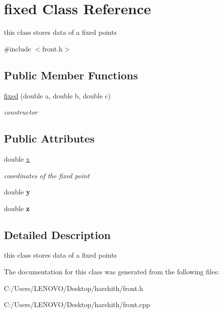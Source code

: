 \hypertarget{classfixed}{}\section{fixed Class Reference}
\label{classfixed}


this class stores data of a fixed points  




{\ttfamily \#include $<$front.\+h$>$}

\subsection*{Public Member Functions}
\begin{DoxyCompactItemize}
\item 
\mbox{\label{classfixed_a357837c437a38a78aabae80136f26679}} 
\mbox{\hyperlink{classfixed_a357837c437a38a78aabae80136f26679}{fixed}} (double a, double b, double c)
\begin{DoxyCompactList}\small\item\em constructor \end{DoxyCompactList}\end{DoxyCompactItemize}
\subsection*{Public Attributes}
\begin{DoxyCompactItemize}
\item 
\mbox{\label{classfixed_ac3c35305966b2316a75c79e76aef0ce9}} 
double \mbox{\hyperlink{classfixed_ac3c35305966b2316a75c79e76aef0ce9}{x}}
\begin{DoxyCompactList}\small\item\em coordinates of the fixed point \end{DoxyCompactList}\item 
\mbox{\label{classfixed_a10c4f865dbe84362b2be2661e4bc6c44}} 
double {\bfseries y}
\item 
\mbox{\label{classfixed_ab267627f6647ec42ad6937bf57e45f41}} 
double {\bfseries z}
\end{DoxyCompactItemize}


\subsection{Detailed Description}
this class stores data of a fixed points 

The documentation for this class was generated from the following files\+:\begin{DoxyCompactItemize}
\item 
C\+:/\+Users/\+L\+E\+N\+O\+V\+O/\+Desktop/harshith/front.\+h\item 
C\+:/\+Users/\+L\+E\+N\+O\+V\+O/\+Desktop/harshith/front.\+cpp\end{DoxyCompactItemize}
